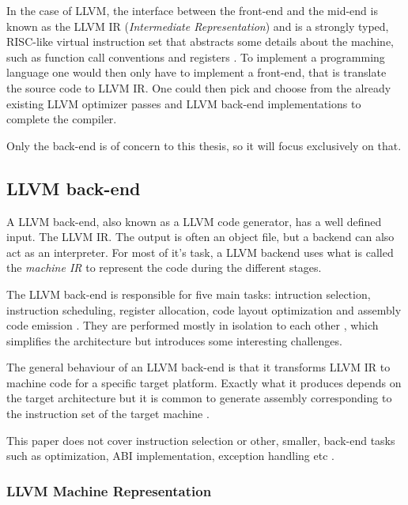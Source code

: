 In the case of LLVM, the interface between the front-end and the mid-end is known as the
LLVM IR (\textit{Intermediate Representation}) and is a strongly typed, RISC-like virtual
instruction set that abstracts some details about the machine, such as function call
conventions and registers \cite[Section~11.3]{aosa-llvm}. To implement a programming language
one would then only have to implement a front-end, that is translate the source code to
LLVM IR. One could then pick and choose from the already existing LLVM optimizer passes
and LLVM back-end implementations to complete the compiler\cite[Section~11.5]{aosa-llvm}.

Only the back-end is of concern to this thesis, so it will focus exclusively on that.

\subsection{LLVM back-end}

A LLVM back-end, also known as a LLVM code generator, has a well defined input. The
LLVM IR\cite[Section~11.4.1]{aosa-llvm}. The output is often an object file, but a backend
can also act as an interpreter. For most of it's task, a LLVM backend uses what is called
the \textit{machine IR} to represent the code during the different stages.

The LLVM back-end is responsible for five main tasks: intruction selection, instruction
scheduling, register allocation, code layout optimization and assembly code emission
\cite{llvm-writing-backend, llvm-codegenerator-highlevel, aosa-llvm}. They are performed
mostly in isolation to each other \cite[Section~11.5]{aosa-llvm}, which simplifies the
architecture but introduces some interesting challenges.

The general behaviour of an LLVM back-end is that it transforms LLVM IR to machine code
for a specific target platform. Exactly what it produces depends on the target architecture
but it is common to generate assembly corresponding to the instruction set of the target
machine \cite[Section~11.5]{aosa-llvm}.

This paper does not cover instruction selection or other, smaller, back-end tasks such as
optimization, ABI implementation, exception handling etc \cite[at~1:47]{welcome-to-backend}.

\subsubsection{LLVM Machine Representation}

